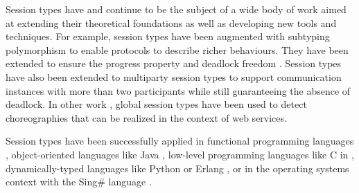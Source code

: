Session types have and continue to be the subject of a wide body of work aimed at extending their theoretical foundations as well as developing new tools and techniques. For example, session types have been augmented with subtyping polymorphism to enable protocols to describe richer behaviours\cite{GaySJ:substp}.
They have been extended to ensure the progress property and deadlock freedom \cite{dyl08}. Session types have also been extended to multiparty session types to support communication instances with more than two participants while still guaranteeing the absence of deadlock\cite{HondaK:mulast}. In other work \cite{ch07}, global session types have been used to detect choreographies that can be realized in the context of web services.

Session types have been successfully applied in functional programming languages \cite{VasconcelosVT:sestfm}, object-oriented languages like Java \cite{HuR:sesbdp, gay.vasconcelos.etal_modular-session-types}, low-level programming languages like C in \cite{NgYH12}, dynamically-typed languages like Python\cite{DBLP:conf/rv/NeykovaYH13} or Erlang \cite{erlang},  or in the operating systems context with the Sing\# language \cite{FahndrichM:lansfr}.

